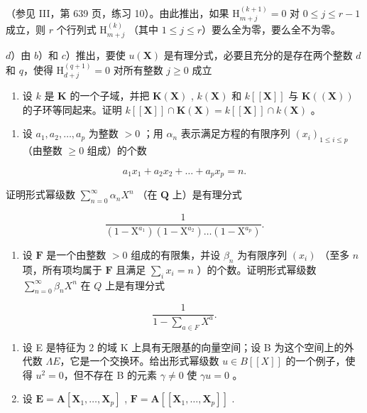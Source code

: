 （参见 III，第 639 页，练习 10）。由此推出，如果 \(\mathrm{H}_{m+j}^{(k+1)} = 0\) 对 \(0 \leqslant j \leqslant r-1\) 成立，则 \(r\) 个行列式 \(\mathrm{H}_{m+j}^{(k)}\) （其中 \(1 \leqslant j \leqslant r\)）要么全为零，要么全不为零。

\(d\)）由 \(b\)）和 \(c\)）推出，要使 \(u(\mathbf{X})\) 是有理分式，必要且充分的是存在两个整数 \(d\) 和 \(q\)，使得 \(\mathrm{H}_{d + j}^{(q + 1)} = 0\) 对所有整数 \(j\geqslant 0\) 成立

\begin{enumerate}
\def\labelenumi{\alph{enumi})}
\setcounter{enumi}{4}
\tightlist
\item
  设 \(k\) 是 \(\mathbf{K}\) 的一个子域，并把 \(\mathbf{K}(\mathbf{X})\) , \(k(\mathbf{X})\) 和 \(k[[\mathbf{X}]]\) 与 \(\mathbf{K}((\mathbf{X}))\) 的子环等同起来。证明 \(k[[\mathbf{X}]] \cap \mathbf{K}(\mathbf{X}) = k[[\mathbf{X}]] \cap k(\mathbf{X})\) 。
\end{enumerate}

\begin{enumerate}
\def\labelenumi{\arabic{enumi})}
\setcounter{enumi}{1}
\tightlist
\item
  设 \(a_1, a_2, \ldots, a_p\) 为整数 \(> 0\) ；用 \(\alpha_n\) 表示满足方程的有限序列 \((x_i)_{1 \leqslant i \leqslant p}\) （由整数 \(\geqslant 0\) 组成）的个数
\end{enumerate}

\[
a _ {1} x _ {1} + a _ {2} x _ {2} + \dots + a _ {p} x _ {p} = n.
\]

证明形式幂级数 \(\sum_{n=0}^{\infty} \alpha_n X^n\) （在 \(\mathbf{Q}\) 上）是有理分式

\[
\frac {1}{(1 - \mathrm{X} ^ {a _ {1}}) (1 - \mathrm{X} ^ {a _ {2}}) \dots (1 - \mathrm{X} ^ {a _ {p}})}.
\]

\begin{enumerate}
\def\labelenumi{\arabic{enumi})}
\setcounter{enumi}{2}
\tightlist
\item
  设 \(\mathbf{F}\) 是一个由整数 \(> 0\) 组成的有限集，并设 \(\beta_{n}\) 为有限序列 \((x_{i})\) （至多 \(n\) 项，所有项均属于 \(\mathbf{F}\) 且满足 \(\sum_{i} x_{i} = n\) ）的个数。证明形式幂级数 \(\sum_{n=0}^{\infty} \beta_n X^n\) 在 \(Q\) 上是有理分式
\end{enumerate}

\[
\frac {1}{1 - \sum_ {a \in F} X ^ {a}}.
\]

\begin{enumerate}
\def\labelenumi{\arabic{enumi})}
\setcounter{enumi}{3}
\item
  设 E 是特征为 2 的域 K 上具有无限基的向量空间；设 B 为这个空间上的外代数 \(\Lambda E\)，它是一个交换环。给出形式幂级数 \(u \in B[[X]]\) 的一个例子，使得 \(u^2 = 0\)，但不存在 B 的元素 \(\gamma \neq 0\) 使 \(\gamma u = 0\) 。
\item
  设 \(\mathbf{E} = \mathbf{A}[\mathbf{X}_1, \dots, \mathbf{X}_p]\) , \(\mathbf{F} = \mathbf{A}[[\mathbf{X}_1, \dots, \mathbf{X}_p]]\) .
\end{enumerate}

